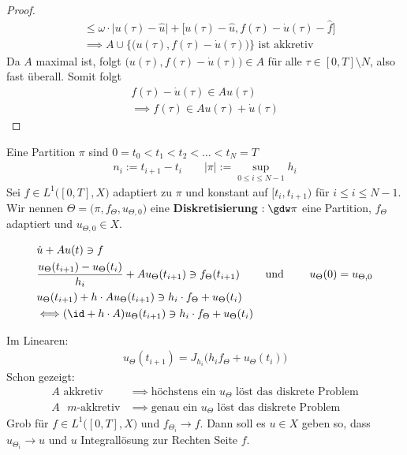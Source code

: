 \begin{proof}
\begin{align*}
&\leq\omega\cdot\big|u(\tau)-\hat{u}\big|+\big[u(\tau)-\hat{u},f(\tau)-\dot{u}(\tau)-\hat{f}\big]\\
&\implies
A\cup\Big\lbrace\big(u(\tau),f(\tau)-\dot{u}(\tau)\big)\Big\rbrace\text{ ist akkretiv}
\end{align*}
Da $A$ maximal ist, folgt $\big(u(\tau),f(\tau)-\dot{u}(\tau)\big)\in A$ für alle $\tau\in[0,T]\setminus N$, also fast überall. Somit folgt
\begin{align*}
f(\tau)-\dot{u}(\tau)\in A u(\tau)\\
\implies f(\tau)\in A u(\tau)+\dot{u}(\tau)
\end{align*}
\end{proof}

\begin{definition}
Eine Partition $\pi$ sind $0=t_0<t_1<t_2<\ldots<t_N=T$
\begin{align*}
n_i:=t_{i+1}-t_i\qquad |\pi|:=\sup\limits_{0\leq i\leq N-1} h_i
\end{align*}
Sei $f\in L^1\big([0,T],X\big)$ adaptiert zu $\pi$ und konstant auf $[t_i,t_{i+1})$ für $i\leq i\leq N-1$.\\
Wir nennen $\Theta=\big(\pi,f_\Theta,u_{\Theta,0}\big)$ eine \textbf{Diskretisierung} $:\gdw\pi$ eine Partition, $f_\Theta$ adaptiert und $u_{\Theta,0}\in X$.
\end{definition}
\begin{align*}
&\dot{u}+Au(t)\ni f\\
&\frac{u_\Theta(t_{i+1})-u_\Theta(t_i)}{h_i}+Au_\Theta(t_{i+1})\ni f_\Theta(t_{i+1})
\qquad\text{ und }\qquad
u_\Theta(0)=u_{\Theta,0}\\
&u_\Theta(t_{i+1})+h\cdot A u_\Theta(t_{i+1})\ni h_i\cdot f_\Theta+u_\Theta(t_i)\\
&\Longleftrightarrow (\id+h\cdot A)u_\Theta(t_{i+1})\ni h_i\cdot f_\Theta+u_\Theta(t_i)
\end{align*}

Im Linearen:
\begin{align*}
u_\Theta(t_{i+1})=J_{h_i}\big(h_i f_\Theta+u_\Theta(t_i)\big)
\end{align*}
Schon gezeigt:
\begin{align*}
A\text{ akkretiv}&\implies\text{höchstens ein $u_\Theta$ löst das diskrete Problem}\\
A\text{ $m$-akkretiv}&\implies\text{genau ein $u_\Theta$ löst das diskrete Problem}
\end{align*}
Grob für $f\in L^1\big([0,T],X\big)$ und $f_{\Theta_i}\longrightarrow f$. Dann soll es $u\in X$ geben so, dass $u_{\Theta_i}\longrightarrow u$ und $u$ Integrallösung zur Rechten Seite $f$.


